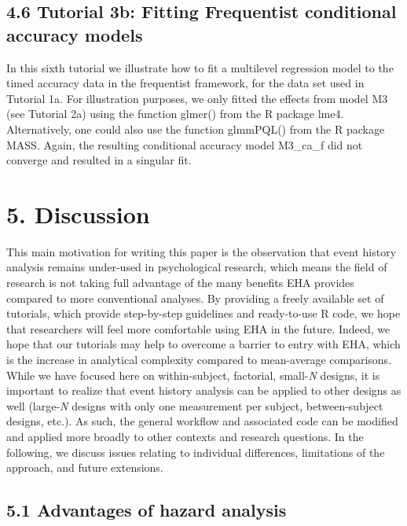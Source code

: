 \documentclass[
  man,floatsintext]{apa6}
\begin{document}
\subsection{4.6 Tutorial 3b: Fitting Frequentist conditional accuracy models}\label{tutorial-3b-fitting-frequentist-conditional-accuracy-models}

In this sixth tutorial we illustrate how to fit a multilevel regression model to the timed accuracy data in the frequentist framework, for the data set used in Tutorial 1a. For illustration purposes, we only fitted the effects from model M3 (see Tutorial 2a) using the function glmer() from the R package lme4. Alternatively, one could also use the function glmmPQL() from the R package MASS. Again, the resulting conditional accuracy model M3\_ca\_f did not converge and resulted in a singular fit.

\section{5. Discussion}\label{discussion}

This main motivation for writing this paper is the observation that event history analysis remains under-used in psychological research, which means the field of research is not taking full advantage of the many benefits EHA provides compared to more conventional analyses. By providing a freely available set of tutorials, which provide step-by-step guidelines and ready-to-use R code, we hope that researchers will feel more comfortable using EHA in the future. Indeed, we hope that our tutorials may help to overcome a barrier to entry with EHA, which is the increase in analytical complexity compared to mean-average comparisons. While we have focused here on within-subject, factorial, small-\emph{N} designs, it is important to realize that event history analysis can be applied to other designs as well (large-\emph{N} designs with only one measurement per subject, between-subject designs, etc.). As such, the general workflow and associated code can be modified and applied more broadly to other contexts and research questions. In the following, we discuss issues relating to individual differences, limitations of the approach, and future extensions.

\subsection{5.1 Advantages of hazard analysis}\label{advantages-of-hazard-analysis}
\end{document}
